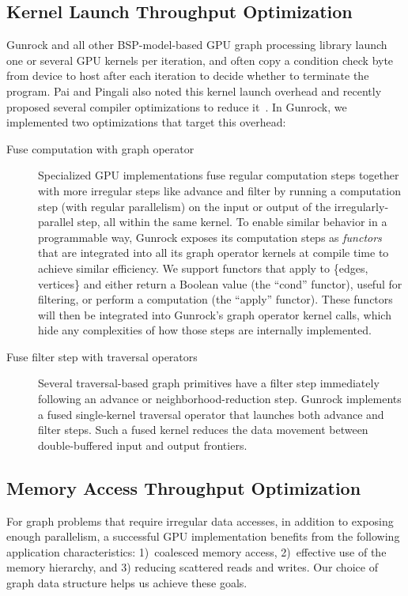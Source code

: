 \documentclass[format=acmsmall,review=false,screen=true]{acmart}
\begin{document}
\subsection{Kernel Launch Throughput Optimization}
Gunrock and all other BSP-model-based GPU graph processing library
launch one or several GPU kernels per iteration, and often copy a
condition check byte from device to host after each iteration to
decide whether to terminate the program. Pai and Pingali also noted
this kernel launch overhead and recently proposed several compiler
optimizations to reduce it~. In Gunrock, we
implemented two optimizations that target this overhead:
\begin{description}
\item[Fuse computation with graph operator] Specialized GPU
  implementations fuse regular computation steps together with more
  irregular steps like advance and filter by running a computation
  step (with regular parallelism) on the input or output of the
  irregularly-parallel step, all within the same kernel. To enable
  similar behavior in a programmable way, Gunrock exposes its
  computation steps as \emph{functors} that are integrated into all
  its graph operator kernels at compile time to achieve similar
  efficiency. We support functors that apply to \{edges, vertices\}
  and either return a Boolean value (the ``cond'' functor), useful for
  filtering, or perform a computation (the ``apply'' functor). These
  functors will then be integrated into Gunrock's graph operator
  kernel calls, which hide any complexities of how those steps are
  internally implemented.
\item[Fuse filter step with traversal operators] Several
  traversal-based graph primitives have a filter step immediately
  following an advance or neighborhood-reduction step. Gunrock
  implements a fused single-kernel traversal operator that launches
  both advance and filter steps. Such a fused kernel reduces the data
  movement between double-buffered input and output frontiers.
\end{description}

\subsection{Memory Access Throughput Optimization}
\label{subsec:mem_optimization}
For graph problems that require irregular data accesses, in addition
to exposing enough parallelism, a successful GPU implementation
benefits from the following application characteristics: 1)~coalesced
memory access, 2)~effective use of the memory hierarchy, and 3)
reducing scattered reads and writes. Our choice of graph data
structure helps us achieve these goals.
\end{document}

